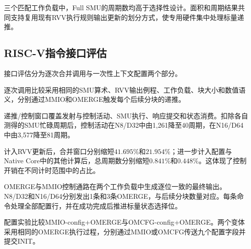 \documentclass[journal]{IEEEtran}
\begin{document}
三个匹配工作负载中，Full SMU的周期数均高于选择性设计。面积和周期结果共同支持复用现有RVV执行规则输出更新的划分方式，使专用硬件集中处理标量递推。

\subsection{RISC-V指令接口评估}
接口评估分为逐次合并调用与一次性上下文配置两个部分。

逐次调用比较采用相同的SMU算术、RVV输出例程、工作负载、块大小和数值语义，分别通过MMIO和OMERGE触发每个后续分块的递推。

递推/控制窗口覆盖发射与控制活动、SMU执行、响应提交和状态消费。扣除各自测得的SMU忙碌周期后，控制活动在N8/D32中由1,261降至40周期，在N16/D64中由3,577降至81周期。

计入RVV更新后，合并窗口分别缩短$41.695\%$和$21.954\%$；进一步计入配置与Native Core中的其他计算后，总周期数分别缩短$0.841\%$和$0.448\%$。这体现了控制开销在不同计时范围中的占比。

OMERGE与MMIO控制通路在两个工作负载中生成逐位一致的最终输出。N8/D32和N16/D64分别发出1条和3条OMERGE，与后续分块数量对应。每条命令处理全部配置行，并在成功完成后推进标量状态选择位。

配置实验比较MMIO-config+OMERGE与OMCFG-config+OMERGE。两个变体采用相同的OMERGE执行过程，分别通过MMIO或OMCFG传送九个配置字段并提交INIT。
\end{document}
